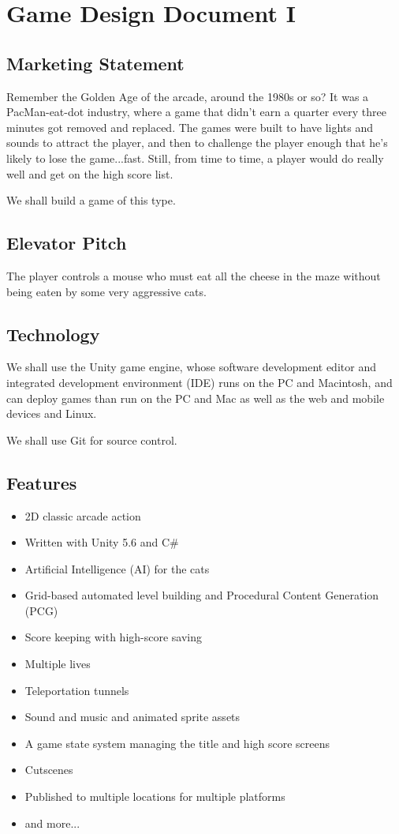 \documentclass[12pt]{amsbook}
\theoremstyle{definition}
\theoremstyle{remark}
\numberwithin{figure}{chapter}
\numberwithin{table}{chapter}
\numberwithin{section}{chapter}
\numberwithin{equation}{section}
\newcommand{\csharp}{\ensuremath{\mbox{C}\#}\xspace}
\begin{document}
\section{Game Design Document I}

\subsection{Marketing Statement}

Remember the Golden Age of the arcade, around the 1980s or so? It was a PacMan-eat-dot industry, where a game that didn't earn a quarter every three minutes got removed and replaced. The games were built to have lights and sounds to attract the player, and then to challenge the player enough that he's likely to lose the game...fast. Still, from time to time, a player would do really well and get on the high score list.

We shall build a game of this type. 

\subsection{Elevator Pitch}
The player controls a mouse who must eat all the cheese in the maze without being eaten by some very aggressive cats. 

\subsection{Technology}
We shall use the Unity game engine, whose software development editor and integrated development environment (IDE) runs on the PC and Macintosh, and can deploy games than run on the PC and Mac as well as the web and mobile devices and Linux.

We shall use Git for source control.

\subsection{Features}

\begin{itemize}
\item 2D classic arcade action
\item Written with Unity 5.6 and \csharp
\item Artificial Intelligence (AI) for the cats
\item Grid-based automated level building and Procedural Content Generation (PCG)
\item Score keeping with high-score saving
\item Multiple lives
\item Teleportation tunnels
\item Sound and music and animated sprite assets
\item A game state system managing the title and high score screens
\item Cutscenes
\item Published to multiple locations for multiple platforms
\item and more...
\end{itemize}
\end{document}
